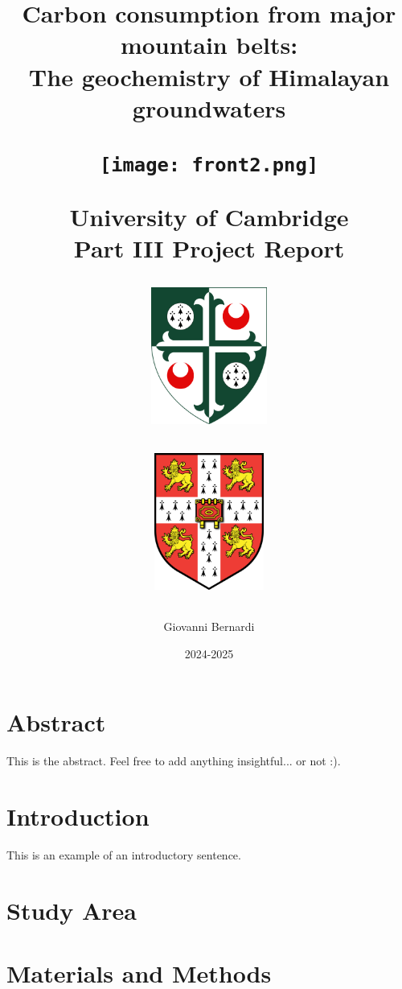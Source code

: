 \documentclass[hidelinks, 12pt]{article} %
\title{
\vspace{-1cm}
\textbf{Carbon consumption from major mountain belts: \\ The geochemistry of Himalayan groundwaters}

\vspace{0.5cm}



\begin{figure}[h]
\texttt{[image: front2.png]}
\centering

\end{figure}


University of Cambridge \\
Part III Project Report \\

\begin{figure}
    \centering
    \begin{subfigure}{.45\textwidth} %
        \centering
        \includegraphics[height=4.5cm]{girton.png} %
        \label{fig:sub1}
    \end{subfigure}%
    \hspace{1.5cm} %
    \begin{subfigure}{.45\textwidth} %
        \centering
        \includegraphics[height=4.5cm]{cambridge.png} %
        \label{fig:sub2}
    \end{subfigure}
    \label{fig:test}
\end{figure}


}
\author{Giovanni Bernardi}
\date{2024-2025} %
\begin{document}
\maketitle




\thispagestyle{empty}

\newpage

\section*{Abstract}
\label{sec:abstract}

This is the abstract. Feel free to add anything insightful... or not :).



\newpage


\thispagestyle{empty}

\tableofcontents

\newpage




\FloatBarrier
{}


\section{Introduction}


This is an example of an introductory sentence.



\section{Study Area}





\section{Materials and Methods}
\end{document}
